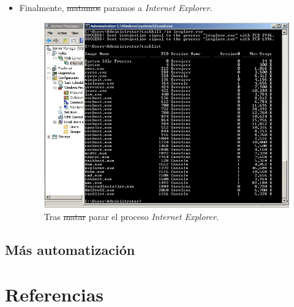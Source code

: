 \documentclass[paper=a4, fontsize=11pt]{scrartcl} %
\numberwithin{equation}{section} %
\numberwithin{figure}{section} %
\numberwithin{table}{section} %
\begin{document}
\begin{enumerate}
\begin{itemize}
			\item Finalmente, \sout{matamos} paramos a \textit{Internet Explorer}.
			
			\begin{figure}[H]
				\centering
				\includegraphics[width=15cm]{Ejercicio_25c.jpg}
				\caption{Tras \sout{matar} parar el proceso \textit{Internet Explorer}.}
				\label{fig:die}
			\end{figure}
		\end{itemize}
	
	\subsection{Más automatización}
	
\end{enumerate}

\newpage
\section{Referencias}

\end{document}
